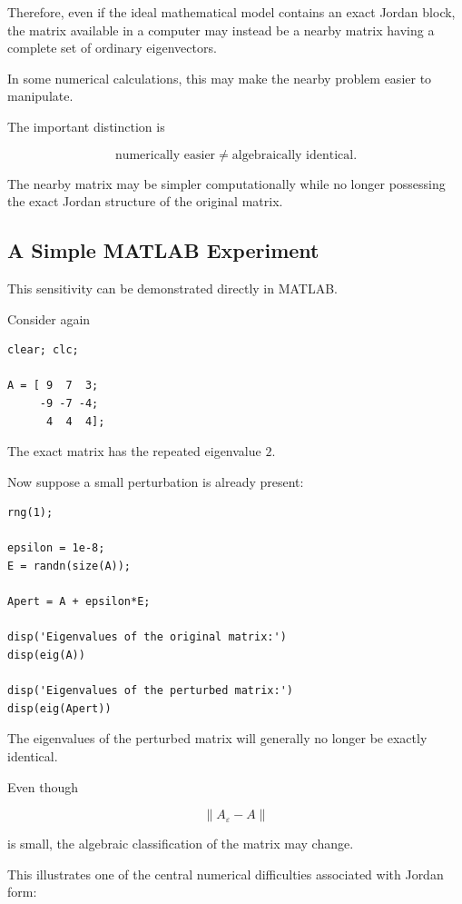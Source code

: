 \documentclass[11pt]{article}
\begin{document}
Therefore, even if the ideal mathematical model contains an exact
Jordan block, the matrix available in a computer may instead be a
nearby matrix having a complete set of ordinary eigenvectors.

In some numerical calculations, this may make the nearby problem easier
to manipulate.

The important distinction is

\[
\boxed{
\text{numerically easier}
\neq
\text{algebraically identical}.
}
\]

The nearby matrix may be simpler computationally while no longer
possessing the exact Jordan structure of the original matrix.


\subsection{A Simple MATLAB Experiment}

This sensitivity can be demonstrated directly in MATLAB.

Consider again

\begin{verbatim}
clear; clc;

A = [ 9  7  3;
     -9 -7 -4;
      4  4  4];
\end{verbatim}

The exact matrix has the repeated eigenvalue \(2\).

Now suppose a small perturbation is already present:

\begin{verbatim}
rng(1);

epsilon = 1e-8;
E = randn(size(A));

Apert = A + epsilon*E;

disp('Eigenvalues of the original matrix:')
disp(eig(A))

disp('Eigenvalues of the perturbed matrix:')
disp(eig(Apert))
\end{verbatim}

The eigenvalues of the perturbed matrix will generally no longer be
exactly identical.

Even though

\[
\|A_{\varepsilon}-A\|
\]

is small, the algebraic classification of the matrix may change.

This illustrates one of the central numerical difficulties associated
with Jordan form:
\end{document}
